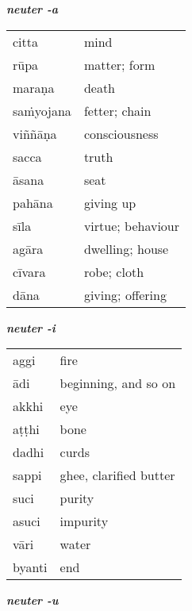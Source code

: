 \documentclass[11pt,oneside]{memoir}
\begin{document}
\begin{multicols}{3}
{\centering\textit{\textbf{neuter -a}}\par}

\begin{center}
\begin{tabular}{ll}
citta & mind\\[0pt]
rūpa & matter; form\\[0pt]
maraṇa & death\\[0pt]
saṁyojana & fetter; chain\\[0pt]
viññāṇa & consciousness\\[0pt]
sacca & truth\\[0pt]
āsana & seat\\[0pt]
pahāna & giving up\\[0pt]
sīla & virtue; behaviour\\[0pt]
agāra & dwelling; house\\[0pt]
cīvara & robe; cloth\\[0pt]
dāna & giving; offering\\[0pt]
\end{tabular}
\end{center}

\columnbreak
{\centering\textit{\textbf{neuter -i}}\par}

\begin{center}
\begin{tabular}{ll}
aggi & fire\\[0pt]
ādi & beginning, and so on\\[0pt]
akkhi & eye\\[0pt]
aṭṭhi & bone\\[0pt]
dadhi & curds\\[0pt]
sappi & ghee, clarified butter\\[0pt]
suci & purity\\[0pt]
asuci & impurity\\[0pt]
vāri & water\\[0pt]
byanti & end\\[0pt]
\end{tabular}
\end{center}

\columnbreak
{\centering\textit{\textbf{neuter -u}}\par}


\end{multicols}
\end{document}
